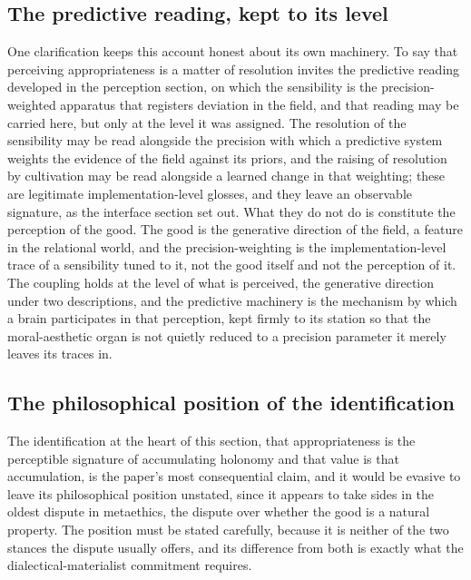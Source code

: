 \subsection{The predictive reading, kept to its level}
\label{p22:sub:coupling-predictive}

One clarification keeps this account honest about its own machinery. To say that perceiving appropriateness is a matter of resolution invites the predictive reading developed in the perception section, on which the sensibility is the precision-weighted apparatus that registers deviation in the field, and that reading may be carried here, but only at the level it was assigned. The resolution of the sensibility may be read alongside the precision with which a predictive system weights the evidence of the field against its priors, and the raising of resolution by cultivation may be read alongside a learned change in that weighting; these are legitimate implementation-level glosses, and they leave an observable signature, as the interface section set out. What they do not do is constitute the perception of the good. The good is the generative direction of the field, a feature in the relational world, and the precision-weighting is the implementation-level trace of a sensibility tuned to it, not the good itself and not the perception of it. The coupling holds at the level of what is perceived, the generative direction under two descriptions, and the predictive machinery is the mechanism by which a brain participates in that perception, kept firmly to its station so that the moral-aesthetic organ is not quietly reduced to a precision parameter it merely leaves its traces in.

\subsection{The philosophical position of the identification}
\label{p22:sub:coupling-position}

The identification at the heart of this section, that appropriateness is the perceptible signature of accumulating holonomy and that value is that accumulation, is the paper's most consequential claim, and it would be evasive to leave its philosophical position unstated, since it appears to take sides in the oldest dispute in metaethics, the dispute over whether the good is a natural property. The position must be stated carefully, because it is neither of the two stances the dispute usually offers, and its difference from both is exactly what the dialectical-materialist commitment requires.

